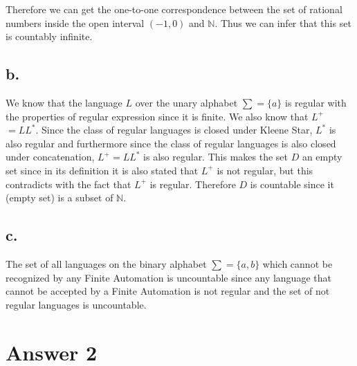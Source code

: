 \documentclass[12pt]{article}
\begin{document}
Therefore we can get the one-to-one correspondence between the set of rational numbers inside the open interval $(-1,0)$  and  $\mathbb{N}$. Thus we can infer that this set is countably infinite.

\subsection*{b.}
We know that the language $L$ over the unary alphabet $\sum = \{a\}$ is regular with the properties of regular expression since it is finite. We also know that $L^+$ $=LL^*$. Since the class of regular languages is closed under Kleene Star, $L^*$ is also regular and furthermore since the class of regular languages is also closed under concatenation, $L^+=LL^*$ is also regular. This makes the set $D$ an empty set since in its definition it is also stated that $L^+$ is not regular, but this contradicts with the fact that $L^+$ is regular. Therefore $D$ is countable since it (empty set) is a subset of $\mathbb{N}$.

\subsection*{c.}
The set of all languages on the binary alphabet $\sum = \{a,b\}$ which cannot be recognized by any Finite Automation is uncountable since any language that cannot be accepted by a Finite Automation is not regular and the set of not regular languages is uncountable.

\section*{Answer 2}
\end{document}
